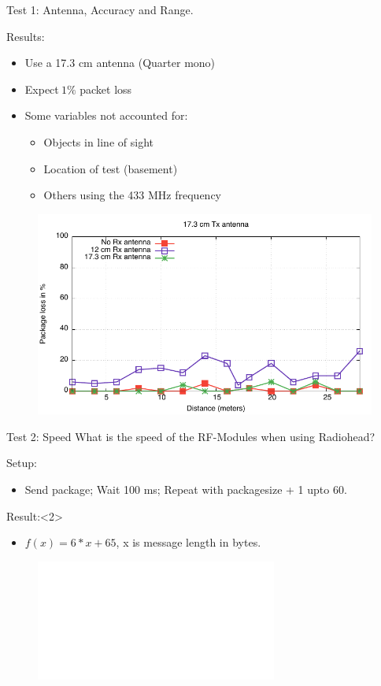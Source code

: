 \begin{frame}{Test 1: Antenna, Accuracy and Range.}
    \begin{block}{Results:}
        \begin{itemize}
            \item Use a 17.3 cm antenna (Quarter mono)
            \item Expect$~1 \%$ packet loss
            \item Some variables not accounted for:
            \begin{itemize}
                \item Objects in line of sight
                \item Location of test (basement)
                \item Others using the 433 MHz frequency
            \end{itemize}
        \end{itemize}
    \end{block}
    
    \begin{figure}
        \includegraphics[height=0.4\textheight,keepaspectratio]{figures/17cm_ant.pdf}
    \end{figure}
\end{frame}

\begin{frame}{Test 2: Speed}
    What is the speed of the RF-Modules when using Radiohead?
    \begin{block}{Setup:}
        \begin{itemize}
            \item Send package; Wait 100 ms; Repeat with packagesize + 1 upto 60.
        \end{itemize}
    \end{block}

    \begin{block}{Result:}<2>
        \begin{itemize}
            \item $f(x)=6 * x + 65$, x is message length in bytes.
        \end{itemize}
    \end{block}
    
    \begin{figure}
        \includegraphics<2>[height=0.4\textheight,keepaspectratio]{figures/time_length.pdf}
    \end{figure}
\end{frame}

